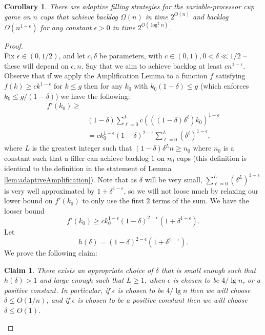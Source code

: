 \documentclass[twocolumn]{article}[10pt]
\newtheorem{clm}{Claim}
\newtheorem{corollary}{Corollary}
\begin{document}
\begin{corollary}
  \label{cor:adaptivePoly}
  There are adaptive filling strategies for the variable-processor cup game on
  $n$ cups that achieve backlog $\Omega(n)$ in time $2^{O(n)}$ and backlog
  $\Omega(n^{1-\epsilon})$ for any constant $\epsilon > 0$ in time $2^{O(\log^2 n)}$.
\end{corollary}
\begin{proof}$ $\\
  Fix $\epsilon \in (0,1/2)$, and let $c, \delta$ be parameters, with $c\in
  (0,1), 0 < \delta \ll 1/2$ -- these will depend on $\epsilon, n$.
  Say that we aim to achieve backlog at least $cn^{1-\epsilon}$.
  Observe that if we apply the Amplification Lemma to a function $f$ satisfying
  $f(k) \ge ck^{1-\epsilon}$ for $k \le g$ then for any $k_0$ with
  $k_0(1-\delta)\le g$ (which enforces $k_0 \le g/ (1-\delta)$) we have the
  following:
  \begin{align*}
  f'(k_0)\ge&\\
  &(1-\delta)\sum_{\ell=0}^L c (((1-\delta)\delta^\ell)k_0)^{1-\epsilon}\\
  &= ck_0^{1-\epsilon} (1-\delta)^{2-\epsilon} \sum_{\ell=0}^L (\delta^\ell)^{1-\epsilon},
  \end{align*}
  where $L$ is the greatest integer such that $(1-\delta)\delta^Ln \ge n_0$
  where $n_0$ is a constant such that a filler can achieve backlog $1$ on $n_0$ cups
  (this definition is identical to the definition in the statement of Lemma
  \ref{lem:adaptiveAmplification}).
  Note that as $\delta$ will be very small, $\sum_{\ell=0}^L
  (\delta^L)^{1-\epsilon}$ is very well approximated by
  $1+\delta^{1-\epsilon}$, so we will not loose much by relaxing our lower
  bound on $f'(k_0)$ to only use the first $2$ terms of the sum. We have the looser bound
  $$f'(k_0) \ge ck_0^{1-\epsilon}(1-\delta)^{2-\epsilon}(1+\delta^{1-\epsilon}).$$
  Let 
  $$h(\delta) = (1-\delta)^{2-\epsilon}(1+\delta^{1-\epsilon}).$$
  We prove the following claim:

  \begin{clm}
    \label{clm:validchoices}
    There exists an appropriate choice of $\delta$ that is small enough such
    that $h(\delta) >1$ and large enough such that $L \ge 1$, when $\epsilon$
    is chosen to be $4/\lg n$, or a positive constant. In particular, if
    $\epsilon$ is chosen to be $4/\lg n$ then we will choose $\delta \le
    O(1/n)$, and if $\epsilon$ is chosen to be a positive constant then we will
    choose $\delta \le O(1)$.
  \end{clm}


\end{proof}
\end{document}
